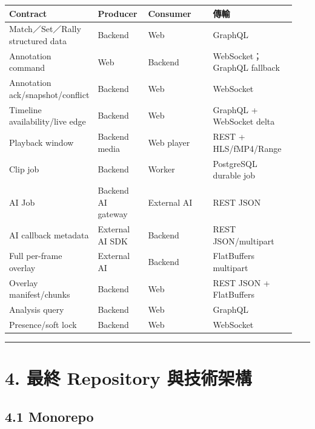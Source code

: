 \documentclass[
  9pt,
  a4paper,
]{article}
\begin{document}
\begin{longtable}[]{@{}>{\RaggedRight\arraybackslash}p{0.11\linewidth}>{\RaggedRight\arraybackslash}p{0.19\linewidth}>{\RaggedRight\arraybackslash}p{0.31\linewidth}>{\RaggedRight\arraybackslash}p{0.33\linewidth}@{}}
\toprule\noalign{}
Contract & Producer & Consumer & 傳輸 \\
\midrule\noalign{}
\endhead
\bottomrule\noalign{}
\endlastfoot
Match／Set／Rally structured data & Backend & Web & GraphQL \\
Annotation command & Web & Backend & WebSocket；GraphQL fallback \\
Annotation ack/snapshot/conflict & Backend & Web & WebSocket \\
Timeline availability/live edge & Backend & Web & GraphQL + WebSocket
delta \\
Playback window & Backend media & Web player & REST + HLS/fMP4/Range \\
Clip job & Backend & Worker & PostgreSQL durable job \\
AI Job & Backend AI gateway & External AI & REST JSON \\
AI callback metadata & External AI SDK & Backend & REST
JSON/multipart \\
Full per-frame overlay & External AI & Backend & FlatBuffers
multipart \\
Overlay manifest/chunks & Backend & Web & REST JSON + FlatBuffers \\
Analysis query & Backend & Web & GraphQL \\
Presence/soft lock & Backend & Web & WebSocket \\
\end{longtable}

\begin{center}\rule{0.5\linewidth}{0.5pt}\end{center}

\section{4. 最終 Repository
與技術架構}\label{4-ux6700ux7d42-repository-ux8207ux6280ux8853ux67b6ux69cb}

\subsection{4.1 Monorepo}\label{41-monorepo}
\end{document}
